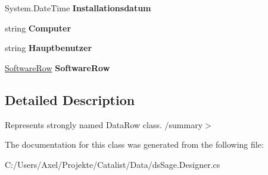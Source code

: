 \begin{DoxyCompactItemize}
\item 
System.\+Date\+Time {\bfseries Installationsdatum}\hypertarget{class_products_1_1_data_1_1ds_sage_1_1_kundensoftware_row_abdac05acda722c14e5a102def9a4aa22}{}\label{class_products_1_1_data_1_1ds_sage_1_1_kundensoftware_row_abdac05acda722c14e5a102def9a4aa22}

\item 
string {\bfseries Computer}\hypertarget{class_products_1_1_data_1_1ds_sage_1_1_kundensoftware_row_a42a9123747f2f1f339cc303998a6c083}{}\label{class_products_1_1_data_1_1ds_sage_1_1_kundensoftware_row_a42a9123747f2f1f339cc303998a6c083}

\item 
string {\bfseries Hauptbenutzer}\hypertarget{class_products_1_1_data_1_1ds_sage_1_1_kundensoftware_row_a5e1ee7167e3097abc964b5259105dda3}{}\label{class_products_1_1_data_1_1ds_sage_1_1_kundensoftware_row_a5e1ee7167e3097abc964b5259105dda3}

\item 
\hyperlink{class_products_1_1_data_1_1ds_sage_1_1_software_row}{Software\+Row} {\bfseries Software\+Row}\hypertarget{class_products_1_1_data_1_1ds_sage_1_1_kundensoftware_row_a0d237b8cc3a6d75f33eb16e17a7c17a2}{}\label{class_products_1_1_data_1_1ds_sage_1_1_kundensoftware_row_a0d237b8cc3a6d75f33eb16e17a7c17a2}

\end{DoxyCompactItemize}


\subsection{Detailed Description}
Represents strongly named Data\+Row class. /summary$>$ 

The documentation for this class was generated from the following file\+:\begin{DoxyCompactItemize}
\item 
C\+:/\+Users/\+Axel/\+Projekte/\+Catalist/\+Data/ds\+Sage.\+Designer.\+cs\end{DoxyCompactItemize}
